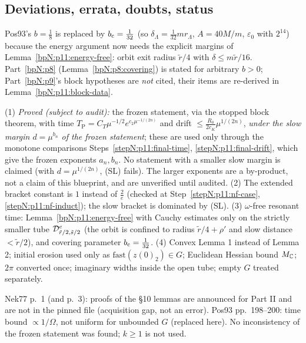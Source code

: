 \subsection{Deviations, errata, doubts, status}\label{bpN:p11:s-dev}

\begin{remark}\label{bpN:p11:b-change}
Pos93's $b=\frac18$ is replaced by $b_{\rm c}=\frac1{32}$ (so $\delta_\Lambda=\frac1{32}m r_\Lambda$, $A=40M/m$, $\varepsilon_0$ with $2^{14}$) because the energy argument now needs the explicit margins of Lemma~\ref{bpN:p11:energy-free}: orbit exit radius $\tilde r/4$ with $\delta\le m\tilde r/16$. Part~\ref{bpN:p8} (Lemma~\ref{bpN:p8:covering}) is stated for arbitrary $b>0$; Part~\ref{bpN:p9}'s block hypotheses are \emph{not} cited, their items are re-derived in Lemma~\ref{bpN:p11:block-data}.
\end{remark}

\begin{remark}\label{bpN:p11:deviations}
(1) \emph{Proved (subject to audit):} the frozen statement, via the stopped block theorem, with time $T_{\mathrm P}=C_T\mu^{-1/2}e^{c_2\mu^{-1/(2n)}}$ and drift $\le\frac{R_0}{2c_K}\mu^{1/(2n)}$, \emph{under the slow margin $d=\mu^{b_n}$ of the frozen statement}; these are used only through the monotone comparisons Steps~\ref{stepN:p11:final-time}, \ref{stepN:p11:final-drift}, which give the frozen exponents $a_n,b_n$. No statement with a smaller slow margin is claimed (with $d=\mu^{1/(2n)}$, (SL) fails). The larger exponents are a by-product, not a claim of this blueprint, and are unverified until audited.
(2) The extended bracket constant is $1$ instead of $\frac2e$ (checked at Step~\ref{stepN:p11:nf-case}, \ref{stepN:p11:nf-induct}); the slow bracket is dominated by (SL).
(3) $\omega$-free resonant time: Lemma~\ref{bpN:p11:energy-free} with Cauchy estimates only on the strictly smaller tube $\mathcal D_{\tilde r/2,\tilde s/2}^e$ (the orbit is confined to radius $\tilde r/4+\rho'$ and slow distance $<\tilde r/2$), and covering parameter $b_{\rm c}=\frac1{32}$.
(4) Convex Lemma 1 instead of Lemma 2; initial erosion used only as $\mathrm{fast}(z(0)_2)\in G$; Euclidean Hessian bound $M_{\mathbb{C}}$; $2\pi$ converted once; imaginary widths inside the open tube; empty $G$ treated separately.
\end{remark}

\begin{remark}\label{bpN:p11:errata}
Nek77 p.~1 (and p.~3): proofs of the \S10 lemmas are announced for Part II and are not in the pinned file (acquisition gap, not an error). Pos93 pp.~198--200: time bound $\propto1/\Omega$, not uniform for unbounded $G$ (replaced here). No inconsistency of the frozen statement was found; $k\ge1$ is not used.
\end{remark}

